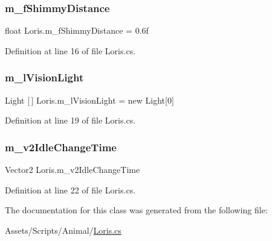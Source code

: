 \subsubsection{\texorpdfstring{m\+\_\+f\+Shimmy\+Distance}{m\_fShimmyDistance}}
{\footnotesize\ttfamily float Loris.\+m\+\_\+f\+Shimmy\+Distance = 0.\+6f}



Definition at line 16 of file Loris.\+cs.

\mbox{\label{class_loris_a9fe9fb5f26fa4f270af644bcb9b25928}} 
\subsubsection{\texorpdfstring{m\+\_\+l\+Vision\+Light}{m\_lVisionLight}}
{\footnotesize\ttfamily Light \mbox{[}$\,$\mbox{]} Loris.\+m\+\_\+l\+Vision\+Light = new Light\mbox{[}0\mbox{]}}



Definition at line 19 of file Loris.\+cs.

\mbox{\label{class_loris_afff951d4ffc192f4dba6f2686dd56cc3}} 
\subsubsection{\texorpdfstring{m\+\_\+v2\+Idle\+Change\+Time}{m\_v2IdleChangeTime}}
{\footnotesize\ttfamily Vector2 Loris.\+m\+\_\+v2\+Idle\+Change\+Time}



Definition at line 22 of file Loris.\+cs.



The documentation for this class was generated from the following file\+:\begin{DoxyCompactItemize}
\item 
Assets/\+Scripts/\+Animal/\mbox{\hyperlink{_loris_8cs}{Loris.\+cs}}\end{DoxyCompactItemize}
